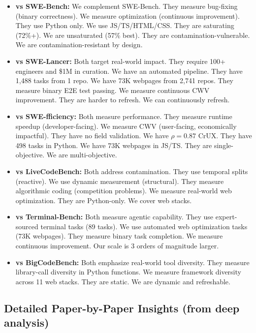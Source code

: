 \begin{itemize}
    \item \textbf{vs SWE-Bench:} We complement SWE-Bench. They measure bug-fixing (binary correctness). We measure optimization (continuous improvement). They use Python only. We use JS/TS/HTML/CSS. They are saturating (72\%+). We are unsaturated (57\% best). They are contamination-vulnerable. We are contamination-resistant by design.

    \item \textbf{vs SWE-Lancer:} Both target real-world impact. They require 100+ engineers and \$1M in curation. We have an automated pipeline. They have 1,488 tasks from 1 repo. We have 73K webpages from 2,741 repos. They measure binary E2E test passing. We measure continuous CWV improvement. They are harder to refresh. We can continuously refresh.

    \item \textbf{vs SWE-fficiency:} Both measure performance. They measure runtime speedup (developer-facing). We measure CWV (user-facing, economically impactful). They have no field validation. We have $\rho = 0.87$ CrUX. They have 498 tasks in Python. We have 73K webpages in JS/TS. They are single-objective. We are multi-objective.

    \item \textbf{vs LiveCodeBench:} Both address contamination. They use temporal splits (reactive). We use dynamic measurement (structural). They measure algorithmic coding (competition problems). We measure real-world web optimization. They are Python-only. We cover web stacks.

    \item \textbf{vs Terminal-Bench:} Both measure agentic capability. They use expert-sourced terminal tasks (89 tasks). We use automated web optimization tasks (73K webpages). They measure binary task completion. We measure continuous improvement. Our scale is 3 orders of magnitude larger.

    \item \textbf{vs BigCodeBench:} Both emphasize real-world tool diversity. They measure library-call diversity in Python functions. We measure framework diversity across 11 web stacks. They are static. We are dynamic and refreshable.
\end{itemize}

\subsection{Detailed Paper-by-Paper Insights (from deep analysis)}

